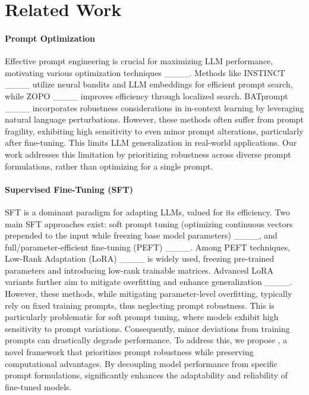 \section{Related Work}
\label{sec:related_work}
\paragraph{Prompt Optimization}
Effective prompt engineering is crucial for maximizing LLM performance, motivating various optimization techniques ____. Methods like INSTINCT ____ utilize neural bandits and LLM embeddings for efficient prompt search, while ZOPO ____ improves efficiency through localized search. BATprompt ____ incorporates robustness considerations in in-context learning by leveraging natural language perturbations. However, these methods often suffer from prompt fragility, exhibiting high sensitivity to even minor prompt alterations, particularly after fine-tuning. This limits LLM generalization in real-world applications. Our work addresses this limitation by prioritizing robustness across diverse prompt formulations, rather than optimizing for a single prompt.

\paragraph{Supervised Fine-Tuning (SFT)}
SFT is a dominant paradigm for adapting LLMs, valued for its efficiency. Two main SFT approaches exist: soft prompt tuning (optimizing continuous vectors prepended to the input while freezing base model parameters) ____, and full/parameter-efficient fine-tuning (PEFT) ____. Among PEFT techniques, Low-Rank Adaptation (LoRA) ____ is widely used, freezing pre-trained parameters and introducing low-rank trainable matrices. Advanced LoRA variants further aim to mitigate overfitting and enhance generalization ____.  However, these methods, while mitigating parameter-level overfitting, typically rely on fixed training prompts, thus neglecting prompt robustness. This is particularly problematic for soft prompt tuning, where models exhibit high sensitivity to prompt variations. Consequently, minor deviations from training prompts can drastically degrade performance. To address this, we propose \ours{}, a novel framework that prioritizes prompt robustness while preserving  computational advantages. By decoupling model performance from specific prompt formulations, \ours{} significantly enhances the adaptability and reliability of fine-tuned models.

